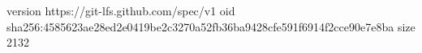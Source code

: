version https://git-lfs.github.com/spec/v1
oid sha256:4585623ae28ed2e0419be2c3270a52fb36ba9428cfe591f6914f2cce90e7e8ba
size 2132

